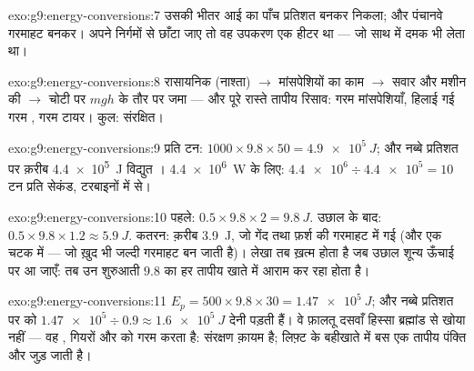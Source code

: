 \begin{solution}{exo:g9:energy-conversions:7}
उसकी भीतर आई  का पाँच प्रतिशत  बनकर निकला; और पंचानवे
गरमाहट बनकर। अपने निर्गमों से छाँटा जाए तो वह उपकरण एक हीटर था ---
जो साथ में दमक भी लेता था।
\end{solution}

\begin{solution}{exo:g9:energy-conversions:8}
रासायनिक (नाश्ता) $\to$ मांसपेशियों का काम $\to$ सवार और मशीन की  $\to$ चोटी पर $m g h$ के तौर पर जमा  --- और पूरे
रास्ते तापीय रिसाव: गरम मांसपेशियाँ, हिलाई गई गरम , गरम टायर। कुल:
संरक्षित।
\end{solution}

\begin{solution}{exo:g9:energy-conversions:9}
प्रति टन: $1000 \times 9.8 \times 50 = \qty{4.9e5}{J}$; और नब्बे
प्रतिशत पर क़रीब \qty{4.4e5}{J} विद्युत । \qty{4.4e6}{W} के लिए:
$\num{4.4e6} \div \num{4.4e5} = 10$ टन प्रति सेकंड, टरबाइनों में से।
\end{solution}

\begin{solution}{exo:g9:energy-conversions:10}
पहले: $0.5 \times 9.8 \times 2 = \qty{9.8}{J}$. उछाल के बाद: $0.5
\times 9.8 \times 1.2 \approx \qty{5.9}{J}$. कतरन: क़रीब \qty{3.9}{J},
जो गेंद तथा फ़र्श की गरमाहट में गई (और एक चटक  में --- जो ख़ुद भी
जल्दी गरमाहट बन जाती है)। लेखा तब ख़त्म होता है जब उछाल शून्य ऊँचाई पर
आ जाएँ: तब उन शुरुआती $9.8$ का हर  तापीय खाते में आराम कर रहा होता
है।
\end{solution}

\begin{solution}{exo:g9:energy-conversions:11}
$E_p = 500 \times 9.8 \times 30 = \qty{1.47e5}{J}$; और नब्बे प्रतिशत
पर  को $\num{1.47e5} \div 0.9 \approx \qty{1.6e5}{J}$ देनी पड़ती
हैं। वे फ़ालतू दसवाँ हिस्सा ब्रह्मांड से खोया नहीं --- वह , गियरों
और  को गरम करता है: संरक्षण क़ायम है; लिफ़्ट के बहीखाते में बस एक
तापीय पंक्ति और जुड़ जाती है।
\end{solution}

